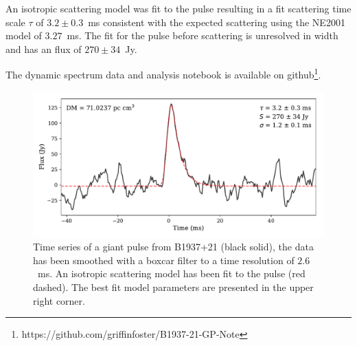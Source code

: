 \documentclass[RNAAS]{aastex62}
\begin{document}
An isotropic scattering model \citep{2017MNRAS.470.2659G} was fit to the pulse
resulting in a fit scattering time scale $\tau$ of $3.2 \pm 0.3$~ms consistent
with the expected scattering using the NE2001 \citep{2002astro.ph..7156C} model of
$3.27$~ms. The fit for the pulse before scattering is unresolved in width and
has an flux of $270 \pm 34$~Jy.

The dynamic spectrum data and analysis notebook is available on
github\footnote{https://github.com/griffinfoster/B1937-21-GP-Note}.

\begin{figure}
	\centering
    \includegraphics[width=0.75\linewidth]{figures/B1937+21_pulse.pdf}
    \caption{Time series of a giant pulse from B1937+21 (black solid), the data
    has been smoothed with a boxcar filter to a time resolution of $2.6$~ms. An
    isotropic scattering model has been fit to the pulse (red dashed). The best fit
    model parameters are presented in the upper right corner.
    }
    \label{fig:pulse}
\end{figure}



\end{document}
